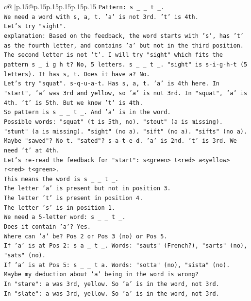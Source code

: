 \documentclass{article}
\begin{document}
{\begin{supertabular}{c@{$\;$}|p{.15\linewidth}@{}p{.15\linewidth}p{.15\linewidth}p{.15\linewidth}p{.15\linewidth}p{.15\linewidth}}
{{{\texttt{Pattern: s \_ \_ t \_.} \\
\texttt{We need a word with s, a, t. 'a' is not 3rd. 't' is 4th.} \\
\texttt{Let's try "sight".} \\
\texttt{explanation: Based on the feedback, the word starts with 's', has 't' as the fourth letter, and contains 'a' but not in the third position. The second letter is not 't'. I will try "sight" which fits the pattern s \_ i g h t? No, 5 letters. s \_ \_ t \_. "sight" is s{-}i{-}g{-}h{-}t (5 letters). It has s, t. Does it have a? No.} \\
\texttt{Let's try "squat". s{-}q{-}u{-}a{-}t. Has s, a, t. 'a' is 4th here. In "start", 'a' was 3rd and yellow, so 'a' is not 3rd. In "squat", 'a' is 4th. 't' is 5th. But we know 't' is 4th.} \\
\texttt{So pattern is s \_ \_ t \_. And 'a' is in the word.} \\
\texttt{Possible words: "squat" (t is 5th, no). "stout" (a is missing). "stunt" (a is missing). "sight" (no a). "sift" (no a). "sifts" (no a).} \\
\texttt{Maybe "sawed"? No t. "sated"? s{-}a{-}t{-}e{-}d. 'a' is 2nd. 't' is 3rd. We need 't' at 4th.} \\
\texttt{Let's re{-}read the feedback for "start": s<green> t<red> a<yellow> r<red> t<green>.} \\
\texttt{This means the word is s \_ \_ t \_.} \\
\texttt{The letter 'a' is present but not in position 3.} \\
\texttt{The letter 't' is present in position 4.} \\
\texttt{The letter 's' is in position 1.} \\
\texttt{We need a 5{-}letter word: s \_ \_ t \_.} \\
\texttt{Does it contain 'a'? Yes.} \\
\texttt{Where can 'a' be? Pos 2 or Pos 3 (no) or Pos 5.} \\
\texttt{If 'a' is at Pos 2: s a \_ t \_. Words: "sauts" (French?), "sarts" (no), "sats" (no).} \\
\texttt{If 'a' is at Pos 5: s \_ \_ t a. Words: "sotta" (no), "sista" (no).} \\
\texttt{Maybe my deduction about 'a' being in the word is wrong?} \\
\texttt{In "stare": a was 3rd, yellow. So 'a' is in the word, not 3rd.} \\
\texttt{In "slate": a was 3rd, yellow. So 'a' is in the word, not 3rd.} \\
}}}
\end{supertabular}}
\end{document}

